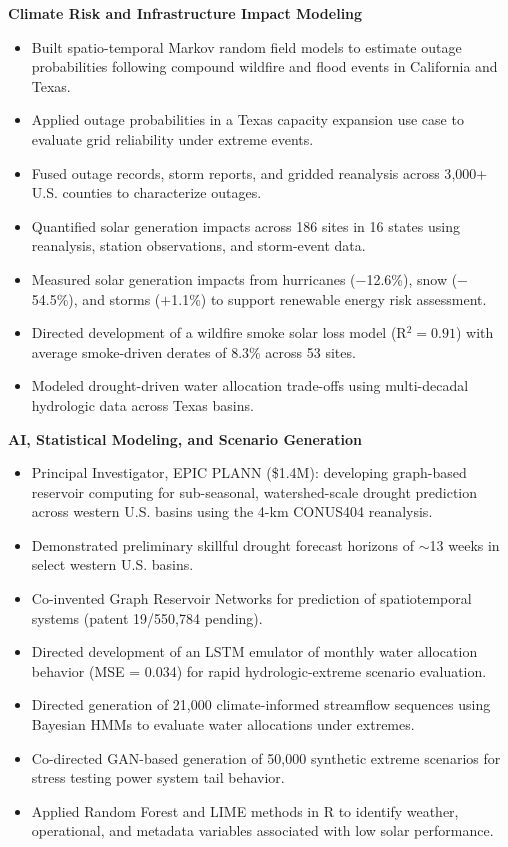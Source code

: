 \documentclass{article}[12pt]
\begin{document}
	\vspace{-0.25em}
	\noindent\textbf{Climate Risk and Infrastructure Impact Modeling}
	\begin{itemize}[leftmargin=*]
		\itemsep0em
		\item Built spatio-temporal Markov random field models to estimate outage probabilities following compound wildfire and flood events in California and Texas.
		\item Applied outage probabilities in a Texas capacity expansion use case to evaluate grid reliability under extreme events.
		\item Fused outage records, storm reports, and gridded reanalysis across 3{,}000+ U.S. counties to characterize outages.
		\item Quantified solar generation impacts across 186 sites in 16 states using reanalysis, station observations, and storm-event data.
		\item Measured solar generation impacts from hurricanes ($-$12.6\%), snow ($-$54.5\%), and storms ($+$1.1\%) to support renewable energy risk assessment.
		\item Directed development of a wildfire smoke solar loss model (R$^{2}=0.91$) with average smoke-driven derates of 8.3\% across 53 sites.
		\item Modeled drought-driven water allocation trade-offs using multi-decadal hydrologic data across Texas basins.
	\end{itemize}
	
	\vspace{0.5em}
	\noindent
	\textbf{AI, Statistical Modeling, and Scenario Generation}
	\begin{itemize}[leftmargin=*]
		\itemsep0em
		\item Principal Investigator, EPIC PLANN (\$1.4M): developing graph-based reservoir computing for sub-seasonal, watershed-scale drought prediction across western U.S. basins using the 4-km CONUS404 reanalysis.
		\item Demonstrated preliminary skillful drought forecast horizons of $\sim$13 weeks in select western U.S. basins.
		\item Co-invented Graph Reservoir Networks for prediction of spatiotemporal systems (patent 19/550,784 pending).
		\item Directed development of an LSTM emulator of monthly water allocation behavior (MSE = 0.034) for rapid hydrologic-extreme scenario evaluation.
		\item Directed generation of 21{,}000 climate-informed streamflow sequences using Bayesian HMMs to evaluate water allocations under extremes.
		\item Co-directed GAN-based generation of 50{,}000 synthetic extreme scenarios for stress testing power system tail behavior.
		\item Applied Random Forest and LIME methods in R to identify weather, operational, and metadata variables associated with low solar performance.
	\end{itemize}
	
\end{document}
